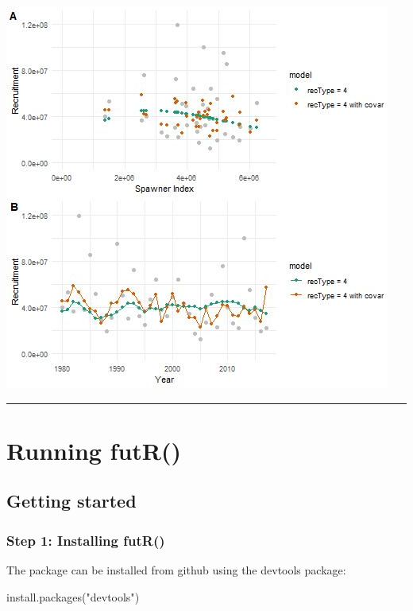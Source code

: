 \documentclass[
]{article}
\newenvironment{Shaded}{\begin{snugshade}}{\end{snugshade}}
\newcommand{\FunctionTok}[1]{\textcolor[rgb]{0.00,0.00,0.00}{#1}}
\newcommand{\NormalTok}[1]{#1}
\newcommand{\StringTok}[1]{\textcolor[rgb]{0.31,0.60,0.02}{#1}}
\begin{document}
\includegraphics{Figs/recplot5.jpg}

\begin{center}\rule{0.5\linewidth}{0.5pt}\end{center}

\hypertarget{running-futr}{%
\section{Running futR()}\label{running-futr}}

\hypertarget{getting-started}{%
\subsection{Getting started}\label{getting-started}}

\hypertarget{step-1-installing-futr}{%
\subsubsection{Step 1: Installing futR()}\label{step-1-installing-futr}}

The package can be installed from github using the devtools package:

\begin{Shaded}
\begin{Highlighting}[]
\FunctionTok{install.packages}\NormalTok{(}\StringTok{"devtools"}\NormalTok{)}
\end{Highlighting}
\end{Shaded}
\end{document}
